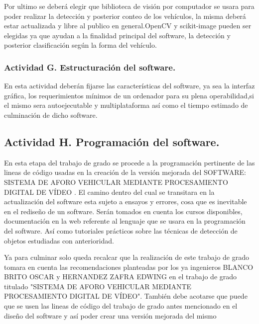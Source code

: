Por ultimo se deberá elegir que biblioteca de visión por computador se usara para poder realizar la detección y posterior conteo de los vehículos, la misma deberá estar actualizada y libre al publico en general.OpenCV y scikit-image pueden ser elegidas ya que ayudan a la finalidad principal del software, la detección y posterior clasificación según la forma del vehículo.

\subsubsection{Actividad G. Estructuración del software.}

En esta actividad deberán fijarse las características del software, ya sea la interfaz gráfica, los requerimientos mínimos de un ordenador para su plena operabilidad,si el mismo sera autoejecutable y multiplataforma así como el tiempo estimado de culminación de dicho software.

\subsection{Actividad H. Programación del software.}

En esta etapa del trabajo de grado se procede a la programación pertinente de las lineas de código usadas en la creación de la versión mejorada del SOFTWARE: SISTEMA DE AFORO VEHICULAR MEDIANTE PROCESAMIENTO DIGITAL DE VÍDEO . El camino dentro del cual se transitara en la actualización del software esta sujeto a ensayos y errores, cosa que es inevitable en el rediseño de un software. Serán tomados en cuenta los cursos disponibles, documentación en la web referente al lenguaje que se usara en la programación del software. Así como tutoriales prácticos sobre las técnicas de detección de objetos estudiadas con anterioridad. 

Ya para culminar solo queda recalcar que la realización de este trabajo de grado tomara en cuenta las recomendaciones planteadas por los ya ingenieros BLANCO BRITO OSCAR y HERNANDEZ ZAFRA EDWING en el trabajo de grado titulado "SISTEMA DE AFORO VEHICULAR MEDIANTE PROCESAMIENTO DIGITAL DE VÍDEO". También debe acotarse que puede que se usen las lineas de código del trabajo de grado antes mencionado en el diseño del software y así poder crear una versión mejorada del mismo


